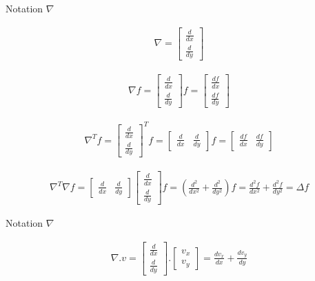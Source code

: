 \begin{frame}{Notation $\nabla$}

\begin{align*}
\nabla = \begin{bmatrix} \frac{d}{dx} \\ \frac{d}{dy} \end{bmatrix}
\end{align*}

\begin{align*}
\nabla f 
= \begin{bmatrix} \frac{d}{dx} \\ \frac{d}{dy} \end{bmatrix} f 
= \begin{bmatrix} \frac{df}{dx} \\ \frac{df}{dy}
\end{bmatrix}
\end{align*}

\begin{align*}
\nabla^{T} f 
= \begin{bmatrix} \frac{d}{dx} \\ \frac{d}{dy} \end{bmatrix}^T f
= \begin{bmatrix} \frac{d}{dx} & \frac{d}{dy} \end{bmatrix} f
= \begin{bmatrix} \frac{df}{dx} & \frac{df}{dy} \end{bmatrix}
\end{align*}

\begin{align*}
\nabla^{T} \nabla f = \begin{bmatrix} 
\frac{d}{dx} & \frac{d}{dy} 
\end{bmatrix} \begin{bmatrix} 
\frac{d}{dx} \\ 
\frac{d}{dy} 
\end{bmatrix} f 
= (\frac{d^{2}}{dx^{2}} + \frac{d^{2}}{dy^{2}}) f
= \frac{d^{2}f}{dx^{2}} + \frac{d^{2}f}{dy^{2}}
= \Delta f
\end{align*}
\end{frame}

\begin{frame}{Notation $\nabla$}

\begin{align*}
\nabla . v = \begin{bmatrix} \frac{d}{dx} \\ \frac{d}{dy} \end{bmatrix} .
\begin{bmatrix} v_{x} \\ v_{y} \end{bmatrix}
= \frac{dv_{x}}{dx} + \frac{dv_{y}}{dy}
\end{align*}
\end{frame}



